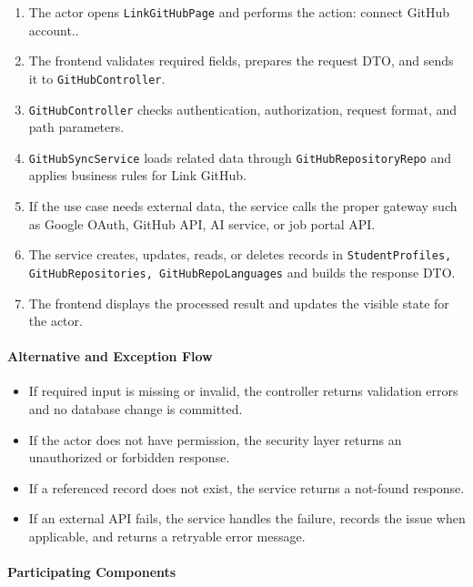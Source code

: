 \begin{enumerate}
    \item The actor opens \texttt{LinkGitHubPage} and performs the action: connect GitHub account..
    \item The frontend validates required fields, prepares the request DTO, and sends it to \texttt{GitHubController}.
    \item \texttt{GitHubController} checks authentication, authorization, request format, and path parameters.
    \item \texttt{GitHubSyncService} loads related data through \texttt{GitHubRepositoryRepo} and applies business rules for Link GitHub.
    \item If the use case needs external data, the service calls the proper gateway such as Google OAuth, GitHub API, AI service, or job portal API.
    \item The service creates, updates, reads, or deletes records in \texttt{StudentProfiles, GitHubRepositories, GitHubRepoLanguages} and builds the response DTO.
    \item The frontend displays the processed result and updates the visible state for the actor.
\end{enumerate}

\paragraph{Alternative and Exception Flow}

\begin{itemize}
    \item If required input is missing or invalid, the controller returns validation errors and no database change is committed.
    \item If the actor does not have permission, the security layer returns an unauthorized or forbidden response.
    \item If a referenced record does not exist, the service returns a not-found response.
    \item If an external API fails, the service handles the failure, records the issue when applicable, and returns a retryable error message.
\end{itemize}

\paragraph{Participating Components}

